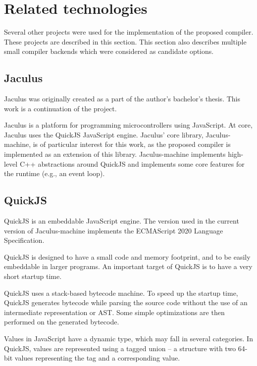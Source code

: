 

\section{Related technologies}

Several other projects were used for the implementation of the proposed compiler. These projects are described in this section. This section also describes multiple small compiler backends which were considered as candidate options.

\subsection{Jaculus}\label{jaculus}

Jaculus was originally created as a part of the author's bachelor's thesis\cite{jaculusthesis}. This work is a continuation of the project.

Jaculus is a platform for programming microcontrollers using JavaScript. At core, Jaculus uses the QuickJS JavaScript engine. Jaculus' core library, Jaculus-machine, is of particular interest for this work, as the proposed compiler is implemented as an extension of this library. Jaculus-machine implements high-level C++ abstractions around QuickJS and implements some core features for the runtime (e.g., an event loop).

\subsection{QuickJS}

QuickJS is an embeddable JavaScript engine. The version used in the current version of Jaculus-machine implements the ECMAScript 2020 Language Specification\cite{ecma262}.

QuickJS is designed to have a small code and memory footprint, and to be easily embeddable in larger programs. An important target of QuickJS is to have a very short startup time.

QuickJS uses a stack-based bytecode machine. To speed up the startup time, QuickJS generates bytecode while parsing the source code without the use of an intermediate representation or AST. Some simple optimizations are then performed on the generated bytecode.

Values in JavaScript have a dynamic type, which may fall in several categories. In QuickJS, values are represented using a tagged union -- a structure with two 64-bit values representing the tag and a corresponding value.

